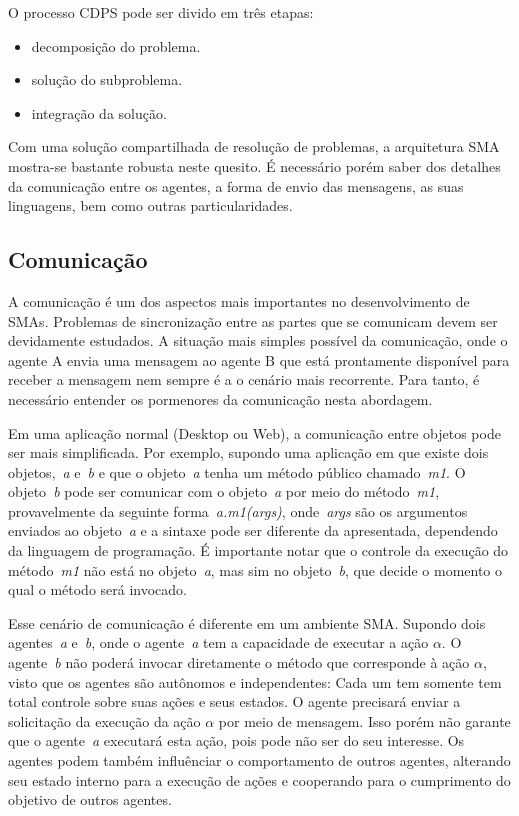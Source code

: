 O processo CDPS pode ser divido em três etapas:
\begin{itemize}
	\item decomposição do problema.
	\item solução do subproblema.
	\item integração da solução.
\end{itemize}

Com uma solução compartilhada de resolução de problemas, a arquitetura SMA mostra-se bastante robusta neste quesito. É necessário porém saber dos detalhes da comunicação entre os agentes, a forma de envio das mensagens, as suas linguagens, bem como outras particularidades.

\subsection{Comunicação}

A comunicação é um dos aspectos mais importantes no desenvolvimento de SMAs. Problemas de sincronização entre as partes que se comunicam devem ser devidamente estudados. A situação mais simples possível da comunicação, onde o agente A envia uma mensagem ao agente B que está prontamente disponível para receber a mensagem nem sempre é a o cenário mais recorrente. Para tanto, é necessário entender os pormenores da comunicação nesta abordagem.

Em uma aplicação normal (Desktop ou Web), a comunicação entre objetos pode ser mais simplificada. Por exemplo, supondo uma aplicação em que existe dois objetos,~\emph{a} e~\emph{b} e que o objeto~\emph{a} tenha um método público chamado~\emph{m1}. O objeto~\emph{b} pode ser comunicar com o objeto~\emph{a} por meio do método~\emph{m1}, provavelmente da seguinte forma~\emph{a.m1(args)}, onde~\emph{args} são os argumentos enviados ao objeto~\emph{a} e a sintaxe pode ser diferente da apresentada, dependendo da linguagem de programação. É importante notar que o controle da execução do método~\emph{m1} não está no objeto~\emph{a}, mas sim no objeto~\emph{b}, que decide o momento o qual o método será invocado.

Esse cenário de comunicação é diferente em um ambiente SMA. Supondo dois agentes~\emph{a} e~\emph{b}, onde o agente~\emph{a} tem a capacidade de executar a ação $\alpha$. O agente~\emph{b} não poderá invocar diretamente o método que corresponde à ação $\alpha$, visto que os agentes são autônomos e independentes: Cada um tem somente tem total controle sobre suas ações e seus estados. O agente precisará enviar a solicitação da execução da ação $\alpha$ por meio de mensagem. Isso porém não garante que o agente~\emph{a} executará esta ação, pois pode não ser do seu interesse. Os agentes podem também influênciar o comportamento de outros agentes, alterando seu estado interno para a execução de ações e cooperando para o cumprimento do objetivo de outros agentes.

